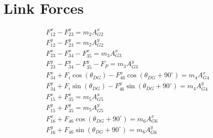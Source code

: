 \documentclass[hidelinks]{article}
\begin{document}
    \FloatBarrier\section*{Link Forces}
    \begin{gather}
        F_{12}^{x}-F_{23}^{x}=m_{2}A_{G2}^{x} \\
        F_{12}^{y}-F_{23}^{y}=m_{2}A_{G2}^{y} \\
        F_{23}^{x}-F_{34}^{x}-F_{35}^{x}=m_{3}A_{G3}^{x} \\
        F_{23}^{y}-F_{34}^{y}-F_{35}^{y}-F_{P}=m_{3}A_{G3}^{y} \\
        F_{34}^{x}+F_{i}\cos(\theta_{DG})-F_{46}^{x}\cos(\theta_{DG}+90^{\circ})=m_{4}A_{G4}^{x} \\
        F_{34}^{y}+F_{i}\sin(\theta_{DG})-F_{46}^{y}\sin(\theta_{DG}+90^{\circ})=m_{4}A_{G4}^{y} \\
        F_{15}^{x}+F_{35}^{x}=m_{5}A_{G5}^{x} \\
        F_{15}^{y}+F_{35}^{y}=m_{5}A_{G5}^{y} \\
        F_{16}^{x}+F_{46}\cos(\theta_{DG}+90^{\circ})=m_{6}A_{G6}^{x} \\
        F_{16}^{y}+F_{46}\sin(\theta_{DG}+90^{\circ})=m_{6}A_{G6}^{y}
    \end{gather}
\end{document}
